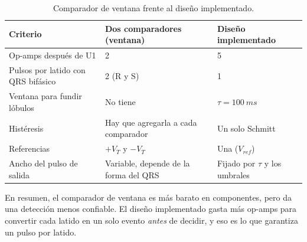 \documentclass[11pt,letterpaper]{article}
\newcommand{\Vref}{V_{ref}}
\begin{document}
\begin{table}[H]
\centering
\caption{Comparador de ventana frente al diseño implementado.}\label{tab:doscomp}
\small
\begin{tabularx}{\linewidth}{@{}>{\raggedright}p{3.6cm}>{\raggedright}p{5.2cm}X@{}}
\toprule
Criterio & Dos comparadores (ventana) & Diseño implementado \\
\midrule
Op-amps después de U1 & 2 & 5 \\
Pulsos por latido con QRS bifásico & 2 (R y S) & 1 \\
Ventana para fundir lóbulos & No tiene & $\tau=\SI{100}{ms}$ \\
Histéresis & Hay que agregarla a cada comparador & Un solo Schmitt \\
Referencias & $+V_T$ y $-V_T$ & Una ($\Vref$) \\
Ancho del pulso de salida & Variable, depende de la forma del QRS & Fijado por $\tau$ y los umbrales \\
\bottomrule
\end{tabularx}
\end{table}

En resumen, el comparador de ventana es más barato en componentes, pero da una detección menos confiable. El diseño implementado gasta más op-amps para convertir cada latido en un solo evento \emph{antes} de decidir, y eso es lo que garantiza un pulso por latido.

\end{document}
